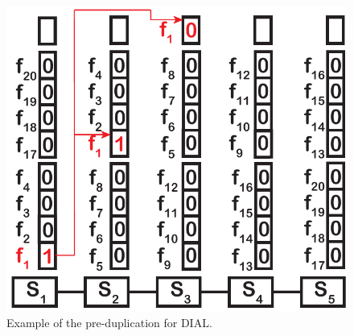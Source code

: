 \begin{figure}
    \centering
    \includegraphics[width=0.6\linewidth]{pic/exam-dial-predup.pdf}
    \caption{Example of the pre-duplication for DIAL.}
    \label{fig:exam-dial-predup}
    \vspace{-0.1in}

\end{figure}
